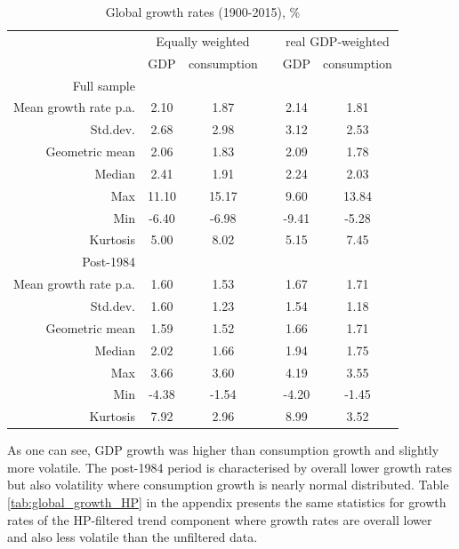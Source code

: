 {{{\renewcommand{\arraystretch}{1.0}
\begin{table}[H]
\begin{center}
\begin{tabular}{rccccc}
\hline
\hline
& \multicolumn{2}{c}{Equally weighted} & & \multicolumn{2}{c}{real GDP-weighted} \\
\cline{2-3} \cline{5-6}
& GDP & consumption & & GDP & consumption\\
\hline
Full sample & & & & &\\
\hline
Mean growth rate p.a. & 2.10 & 1.87 & & 2.14 & 1.81\\
Std.dev. & 2.68 & 2.98 & & 3.12 & 2.53\\
Geometric mean & 2.06 & 1.83 & & 2.09 & 1.78\\
Median & 2.41 & 1.91 & & 2.24 & 2.03\\
Max & 11.10 & 15.17 & & 9.60 & 13.84\\
Min & -6.40 & -6.98 & & -9.41 & -5.28\\
Kurtosis & 5.00 & 8.02 & & 5.15 & 7.45\\
\hline
Post-1984 & & & & &\\
\hline
Mean growth rate p.a. & 1.60 & 1.53 & & 1.67 & 1.71\\
Std.dev. & 1.60 & 1.23 & & 1.54 & 1.18\\
Geometric mean & 1.59 & 1.52 & & 1.66 & 1.71\\
Median & 2.02 & 1.66 & & 1.94 & 1.75\\
Max & 3.66 & 3.60 & & 4.19 & 3.55\\
Min & -4.38 & -1.54 & & -4.20 & -1.45\\
Kurtosis & 7.92 & 2.96 & & 8.99 & 3.52\\
\hline
\hline
\end{tabular} 
\end{center}
\caption{Global growth rates (1900-2015), \%}
\label{tab:global_growth}
\end{table}

As one can see, GDP growth was higher than consumption growth and slightly more volatile. 
The post-1984 period is characterised by overall lower growth rates but also volatility where consumption growth is nearly normal distributed. Table \ref{tab:global_growth_HP} in the appendix presents the same statistics for growth rates of the HP-filtered trend component where growth rates are overall lower and also less volatile than the unfiltered data.


}}}
